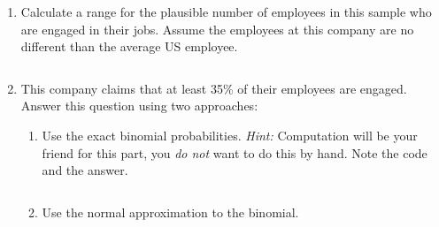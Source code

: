 \documentclass[12pt]{article}
\newcommand{\soln}[2]{$\:$\\ \vspace{#1}}{}
\begin{document}
\begin{enumerate}

\item Calculate a range for the plausible number of employees in this sample who are engaged in their jobs. Assume the employees at this company are no different than the average US employee.

\soln{2cm}{
$Binom(n = 1000, p = 0.315)$, $\mu = 1000 \times 0.315 = 315$, $\sigma = \sqrt{1000 \times 0.315 \times 0.685} = 14.7$ \\
Plausible range: $315 \pm 2 \times 14.7 = (285.6, 344.4) \rightarrow$ between 286 to 344 people.
}

\item This company claims that at least 35\% of their employees are engaged. Answer this question using two approaches:

\begin{enumerate}

\item Use the exact binomial probabilities. \textit{Hint:} Computation will be your friend for this part, you \textit{do not} want to do this by hand. Note the code and the answer.

\soln{1cm}{
\texttt{> sum(dbinom(350:1000, size = 1000, prob = 0.315))} \\
\texttt{[1] 0.0098}
}

\item Use the normal approximation to the binomial.

\soln{5cm}{
Success/failure condition: Expected number of successes, $1000 \times 0.315 = 315$, and expected number of
failures, $1000 \times 0.685 = 685$, are both greater than 10; therefore,
\[ Binom(n = 1000, p = 0.315) \sim N(\mu = 315, \sigma = 14.7) \]
\[ P(K > 350) = P\left( Z > \frac{350 - 315}{14.7} \right) = P(Z > 2.38) = 0.0087 \]
}

\end{enumerate}

\end{enumerate}

\end{document}
